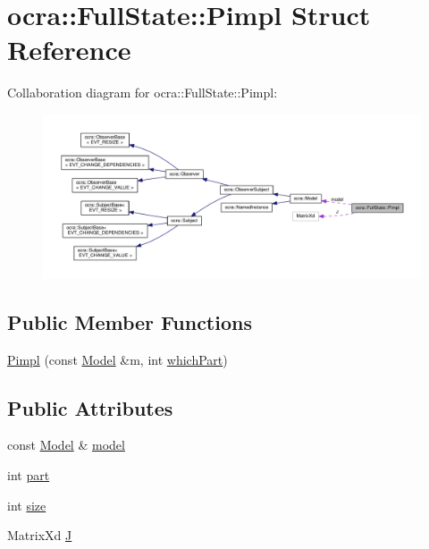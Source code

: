 \hypertarget{structocra_1_1FullState_1_1Pimpl}{}\section{ocra\+:\+:Full\+State\+:\+:Pimpl Struct Reference}
\label{structocra_1_1FullState_1_1Pimpl}


Collaboration diagram for ocra\+:\+:Full\+State\+:\+:Pimpl\+:
\nopagebreak
\begin{figure}[H]
\begin{center}
\leavevmode
\includegraphics[width=350pt]{dc/d60/structocra_1_1FullState_1_1Pimpl__coll__graph}
\end{center}
\end{figure}
\subsection*{Public Member Functions}
\begin{DoxyCompactItemize}
\item 
\hyperlink{structocra_1_1FullState_1_1Pimpl_a0bede192675a41ae72485eacefca15ac}{Pimpl} (const \hyperlink{classocra_1_1Model}{Model} \&m, int \hyperlink{classocra_1_1FullState_a489d85a3e8d2a88f31f0cac4e5f445bf}{which\+Part})
\end{DoxyCompactItemize}
\subsection*{Public Attributes}
\begin{DoxyCompactItemize}
\item 
const \hyperlink{classocra_1_1Model}{Model} \& \hyperlink{structocra_1_1FullState_1_1Pimpl_ac8e2409d7e4a099fdb6fc3ef9c7d3026}{model}
\item 
int \hyperlink{structocra_1_1FullState_1_1Pimpl_ab10f6e199d008d84731024cb80772a5d}{part}
\item 
int \hyperlink{structocra_1_1FullState_1_1Pimpl_a5deca911251aa5b774b3cf7f3f6bd5d4}{size}
\item 
Matrix\+Xd \hyperlink{structocra_1_1FullState_1_1Pimpl_a150f47fa013614729e1e6aedf141523f}{J}
\end{DoxyCompactItemize}


